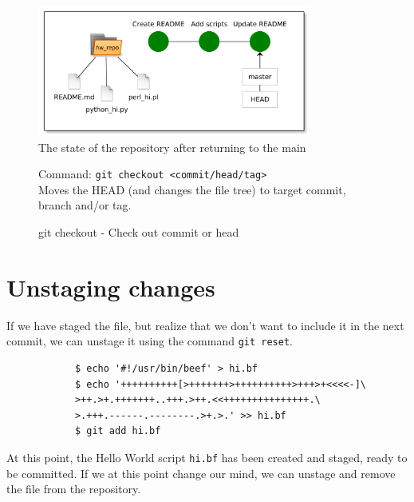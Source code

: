 \documentclass[../main/git_course_main.tex]{subfiles}
\begin{document}
	\begin{figure}[h!]
		\centering
		\includegraphics[width=0.8\textwidth]{../visualizations/chapter2/c26_repo_third_commit.pdf}
		\caption{The state of the repository after returning to the main}
		\label{fig:back_to_master}
	\end{figure}
	
	\begin{figure}[h!]
		\begin{bluebox}
			Command: \verb$git checkout <commit/head/tag>$ \\
			
			Moves the HEAD (and changes the file tree) to target commit, branch and/or tag.
		\end{bluebox}
		\label{command:diff}
		\caption{git checkout - Check out commit or head}
	\end{figure}
	
	\section{Unstaging changes}
	
	If we have staged the file, but realize that we don't want to include it in the next commit, we can unstage it using the command \verb$git reset$. 
	
	\begin{codebox}
		\begin{lstlisting}
			$ echo '#!/usr/bin/beef' > hi.bf
			$ echo '++++++++++[>+++++++>++++++++++>+++>+<<<<-]\
			>++.>+.+++++++..+++.>++.<<+++++++++++++++.\
			>.+++.------.--------.>+.>.' >> hi.bf
			$ git add hi.bf
		\end{lstlisting}
	\end{codebox}
	
	At this point, the Hello World script \verb$hi.bf$ has been created and staged, ready to be committed. If we at this point change our mind, we can unstage and remove the file from the repository.
	
\end{document}
